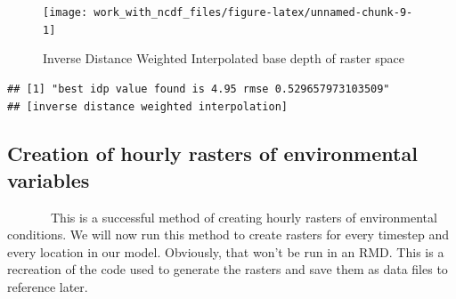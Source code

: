 \documentclass[
]{article}
\begin{document}
\begin{figure}[H]
\texttt{[image: work\_with\_ncdf\_files/figure-latex/unnamed-chunk-9-1]} \caption{Inverse Distance Weighted Interpolated base depth of raster space}\label{fig:unnamed-chunk-9}
\end{figure}

\begin{verbatim}
## [1] "best idp value found is 4.95 rmse 0.529657973103509"
## [inverse distance weighted interpolation]
\end{verbatim}

\newpage
\onehalfspacing

\hypertarget{creation-of-hourly-rasters-of-environmental-variables}{%
\subsection{Creation of hourly rasters of environmental
variables}\label{creation-of-hourly-rasters-of-environmental-variables}}

~~~~~~~This is a successful method of creating hourly rasters of
environmental conditions. We will now run this method to create rasters
for every timestep and every location in our model. Obviously, that
won't be run in an RMD. This is a recreation of the code used to
generate the rasters and save them as data files to reference later.

\singlespacing
\end{document}
